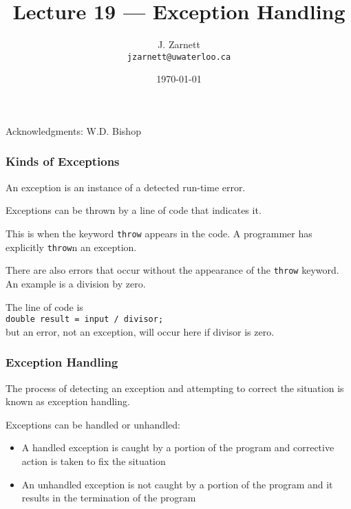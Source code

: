 

\title{Lecture 19 --- Exception Handling }

\author{J. Zarnett\\
\texttt{jzarnett@uwaterloo.ca}}
\date{\today}



\begin{frame}
  \titlepage
  
  \begin{center}
  \small{Acknowledgments: W.D. Bishop}
  \end{center}
\end{frame}

\begin{frame}
\frametitle{Kinds of Exceptions}

An exception is an instance of a detected run-time error.

Exceptions can be thrown by a line of code that indicates it.

This is when the keyword \texttt{throw} appears in the code. A programmer has explicitly \texttt{throw}n an exception.

There are also errors that occur without the appearance of the \texttt{throw} keyword. An example is a division by zero.

The line of code is\\
\quad \texttt{double result = input / divisor; }\\
 but an error, not an exception, will occur here if divisor is zero.

\end{frame}



\begin{frame}
\frametitle{Exception Handling}

The process of detecting an exception and attempting to correct the situation is known as exception handling.

Exceptions can be handled or unhandled:
\begin{itemize}
	\item A \alert{handled} exception is caught by a portion of the program and corrective action is taken to fix the situation
	\item An \alert{unhandled} exception is not caught by a portion of the program and it results in the termination of the program
\end{itemize}

\end{frame}

